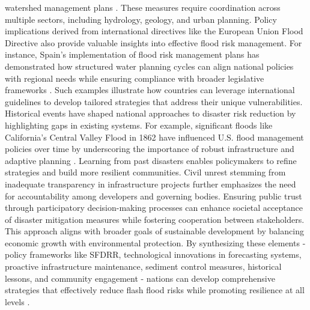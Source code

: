 watershed management plans \citep{Yang2022}. These measures require coordination across multiple sectors, including hydrology, geology, and urban planning. Policy implications derived from international directives like the European Union Flood Directive also provide valuable insights into effective flood risk management. For instance, Spain's implementation of flood risk management plans has demonstrated how structured water planning cycles can align national policies with regional needs while ensuring compliance with broader legislative frameworks \citep{Bodoque2019}. Such examples illustrate how countries can leverage international guidelines to develop tailored strategies that address their unique vulnerabilities. Historical events have shaped national approaches to disaster risk reduction by highlighting gaps in existing systems. For example, significant floods like California's Central Valley Flood in 1862 have influenced U.S. flood management policies over time by underscoring the importance of robust infrastructure and adaptive planning \citep{Abegaz2024}. Learning from past disasters enables policymakers to refine strategies and build more resilient communities. Civil unrest stemming from inadequate transparency in infrastructure projects further emphasizes the need for accountability among developers and governing bodies. Ensuring public trust through participatory decision-making processes can enhance societal acceptance of disaster mitigation measures while fostering cooperation between stakeholders. This approach aligns with broader goals of sustainable development by balancing economic growth with environmental protection. By synthesizing these elements - policy frameworks like SFDRR, technological innovations in forecasting systems, proactive infrastructure maintenance, sediment control measures, historical lessons, and community engagement - nations can develop comprehensive strategies that effectively reduce flash flood risks while promoting resilience at all levels \citep{Saad2024}\citep{Jubach2016}\citep{Munoz2018}.
